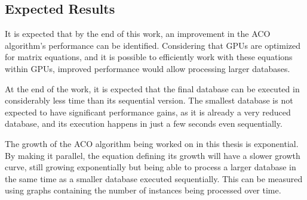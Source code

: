 \subsection{Expected Results} \label{ExpectedResults}

It is expected that by the end of this work, an improvement in the ACO algorithm's performance can be identified. Considering that GPUs are optimized for matrix equations, and it is possible to efficiently work with these equations within GPUs, improved performance would allow processing larger databases.

At the end of the work, it is expected that the final database can be executed in considerably less time than its sequential version. The smallest database is not expected to have significant performance gains, as it is already a very reduced database, and its execution happens in just a few seconds even sequentially.

The growth of the ACO algorithm being worked on in this thesis is exponential. By making it parallel, the equation defining its growth will have a slower growth curve, still growing exponentially but being able to process a larger database in the same time as a smaller database executed sequentially. This can be measured using graphs containing the number of instances being processed over time.
